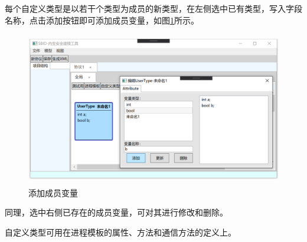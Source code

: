 \par
每个自定义类型是以若干个类型为成员的新类型，在左侧选中已有类型，写入字段名称，点击添加按钮即可添加成员变量，如图\ref{usertype_edit_add}所示。
    \begin{figure}[h]
	\centering
	\includegraphics[width=12cm,height=6.75cm]{imgs/usertype_edit_add.png}
	\caption{添加成员变量}
	\label{usertype_edit_add}
	\end{figure}
\par
同理，选中右侧已存在的成员变量，可对其进行修改和删除。
\par
自定义类型可用在进程模板的属性、方法和通信方法的定义上。

